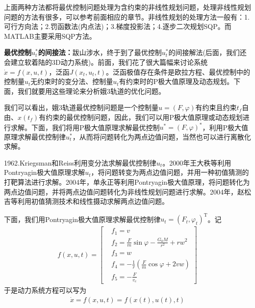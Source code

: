             \par
            上面两种方法都将最优控制问题处理为含约束的非线性规划问题，处理非线性规划问题的方法有很多，可以参考前面相应的章节。非线性规划的处理方法一般有：1.可行方向法；2.罚函数法(内点法)；3.梯度投影法；4.逐步二次规划SQP。而MATLAB主要采用SQP方法。
            \par
            \textbf{最优控制$u_t^*$的间接法：}跋山涉水，终于到了最优控制$u_t^*$的间接解法(后面，我们还会建立软着陆的3D动力系统)。前面，我们花了很大篇幅来讨论系统$\dot{x} = f(x,u,t)$，泛函$J(x_t,u_t,t)$。泛函极值存在条件是欧拉方程、最优控制中的控制量$u_t$无约束时的变分法、控制量$u_t$有约束时的P极大值原理及动态规划。下面，我们就要用这些理论来分析娥3轨道的优化问题。
            \par
            我们可以看出，娥3轨道最优控制问题是一个控制量$u = (F,\varphi)$有约束且约束$t_f$自由、$x(t_f)$有约束的最优控制问题，因此，我们可以用P极大值原理或动态规划进行求解。下面，我们将用P极大值原理求解最优控制$u^* = (F,\varphi)^*$，利用P极大值原理求解最优控制律$u_t^*$，从而将问题转化为两点边值问题，当然也可以进行离散化求解。
            \par
            1962.Kriegsman和Reiss利用变分法求解最优控制律$u_t$。2000年王大秩等利用Pontryagin极大值原理求解$u_t$，将问题转变为两点边值问题，并用一种初值猜测的打靶算法进行求解。2004年，单永正等利用Pontryagin极大值原理，将问题转化为两点边值问题，并将两点边值问题转化为非线性规划问题进行求解。2004年，赵松吉等利用初值猜测技术和线性摄动求解两点边值问题。
            \par
            下面，我们用Pontryagin极大值原理求解最优控制律$u_t = (F_t,\varphi_t)^\mathrm{T}$。记
            \begin{align*}
            f(x,u,t) =
            \left[
            \begin{aligned}
            & f_1 = v\\
            & f_2 = \frac{F}{m}\sin\varphi - \frac{G_0M}{r^2}+rw^2\\
            & f_3 = w\\
            & f_4 = -\frac{1}{r}(\frac{F}{m}\cos\varphi+2vw)\\
            & f_5 = -\frac{F}{v_e}
            \end{aligned}
            \right]
            \end{align*}
            于是动力系统方程可以写为
            \begin{align*}
            \dot{x} = f(x,u,t) = f(x(t),u(t),t)
            \end{align*}
            \par
